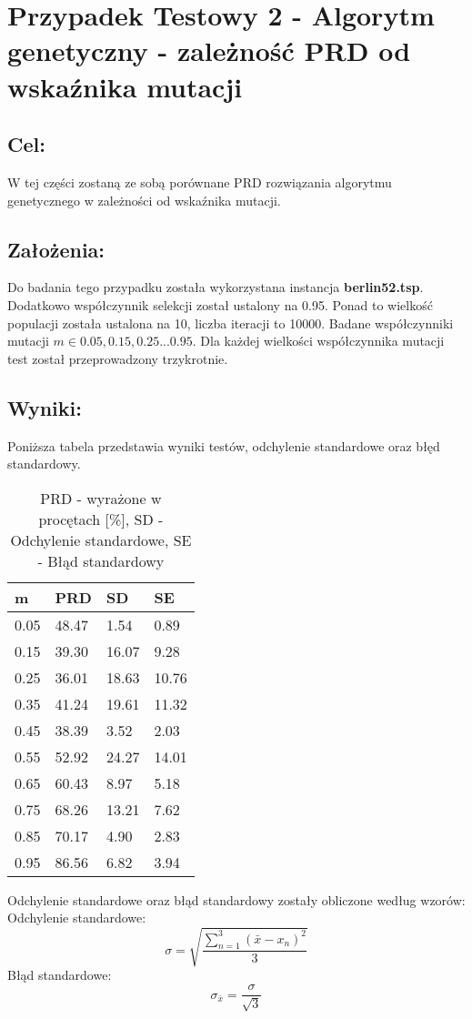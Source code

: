 \section{Przypadek Testowy 2 - Algorytm genetyczny - zależność PRD od wskaźnika mutacji}
  \subsection{Cel:}
    W tej części zostaną ze sobą porównane PRD rozwiązania algorytmu genetycznego w zależności od wskaźnika mutacji.
    \subsection{Założenia:}
    Do badania tego przypadku została wykorzystana instancja \textbf{berlin52.tsp}. Dodatkowo współczynnik selekcji został ustalony na 0.95. Ponad to wielkość populacji została ustalona na 10, liczba iteracji to 10000. Badane współczynniki mutacji \(m \in {0.05, 0.15, 0.25 ... 0.95}\). Dla każdej wielkości współczynnika mutacji test został przeprowadzony trzykrotnie.
  \subsection{Wyniki: }
  Poniższa tabela przedstawia wyniki testów, odchylenie standardowe oraz błęd standardowy.
  \begin{table}[!ht]
    \centering
    \begin{tabular}{|l|l|l|l|}
      \hline
          m & PRD & SD & SE \\ \hline
          0.05 & 48.47 & 1.54 & 0.89 \\ \hline
          0.15 & 39.30 & 16.07 & 9.28 \\ \hline
          0.25 & 36.01 & 18.63 & 10.76 \\ \hline
          0.35 & 41.24 & 19.61 & 11.32 \\ \hline
          0.45 & 38.39 & 3.52 & 2.03 \\ \hline
          0.55 & 52.92 & 24.27 & 14.01 \\ \hline
          0.65 & 60.43 & 8.97 & 5.18 \\ \hline
          0.75 & 68.26 & 13.21 & 7.62 \\ \hline
          0.85 & 70.17 & 4.90 & 2.83 \\ \hline
          0.95 & 86.56 & 6.82 & 3.94 \\ \hline
      \end{tabular}
    \caption{PRD - wyrażone w procętach [\%], SD - Odchylenie standardowe, SE - Błąd standardowy}
    Odchylenie standardowe oraz błąd standardowy zostały obliczone według wzorów: \\
    Odchylenie standardowe:
    \[ \sigma = \sqrt{\frac{\sum_{n = 1}^{3}(\bar{x} - x_n)^2}{3}} \]
    Błąd standardowe:
    \[ \sigma_{\bar{x}} = \frac{\sigma}{\sqrt{3}} \]
\end{table}
